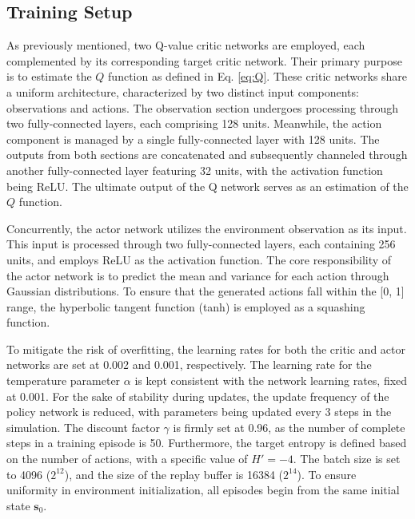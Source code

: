 \subsection{Training Setup}
As previously mentioned, two Q-value critic networks are employed, each complemented by its corresponding target critic network. Their primary purpose is to estimate the $Q$ function as defined in Eq. \ref{eq:Q}. These critic networks share a uniform architecture, characterized by two distinct input components: observations and actions. The observation section undergoes processing through two fully-connected layers, each comprising 128 units. Meanwhile, the action component is managed by a single fully-connected layer with 128 units. The outputs from both sections are concatenated and subsequently channeled through another fully-connected layer featuring 32 units, with the activation function being \ac{ReLU}. The ultimate output of the Q network serves as an estimation of the $Q$ function. 

Concurrently, the actor network utilizes the environment observation as its input. This input is processed through two fully-connected layers, each containing 256 units, and employs ReLU as the activation function. The core responsibility of the actor network is to predict the mean and variance for each action through Gaussian distributions. To ensure that the generated actions fall within the [0, 1] range, the hyperbolic tangent function (tanh) is employed as a squashing function. 

To mitigate the risk of overfitting, the learning rates for both the critic and actor networks are set at 0.002 and 0.001, respectively. The learning rate for the temperature parameter $\alpha$ is kept consistent with the network learning rates, fixed at 0.001. For the sake of stability during updates, the update frequency of the policy network is reduced, with parameters being updated every 3 steps in the simulation. The discount factor $\gamma$ is firmly set at 0.96, as the number of complete steps in a training episode is 50. Furthermore, the target entropy is defined based on the number of actions, with a specific value of $H'=-4$. The batch size is set to 4096 ($2^{12}$), and the size of the replay buffer is 16384 ($2^{14}$). To ensure uniformity in environment initialization, all episodes begin from the same initial state $\mathbf{s}_0$.

